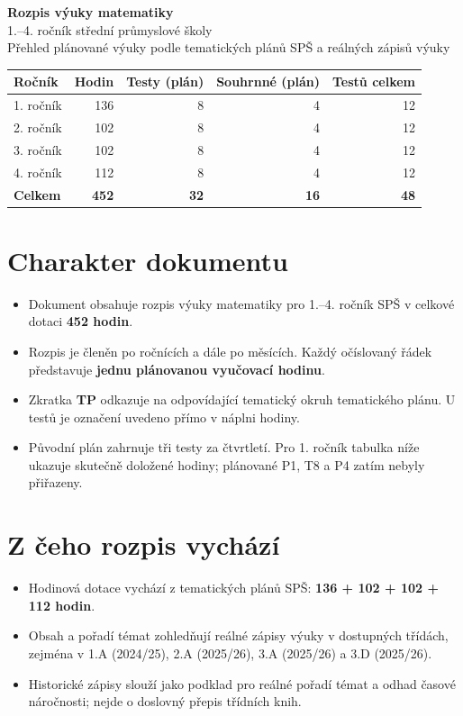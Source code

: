 \documentclass[10pt,a4paper]{article}
\begin{document}
\begin{center}
{\LARGE\bfseries Rozpis výuky matematiky}\\[3mm]
{\large 1.--4. ročník střední průmyslové školy}\\[3mm]
{\small Přehled plánované výuky podle tematických plánů SP\v{S} a reálných zápisů výuky}
\end{center}
\vspace{3mm}
\begin{tabularx}{\textwidth}{@{}Xrrrr@{}}\toprule
\textbf{Ročník} & \textbf{Hodin} & \textbf{Testy (plán)} & \textbf{Souhrnné (plán)} & \textbf{Testů celkem}\\\midrule
1. ročník & 136 & 8 & 4 & 12\\
2. ročník & 102 & 8 & 4 & 12\\
3. ročník & 102 & 8 & 4 & 12\\
4. ročník & 112 & 8 & 4 & 12\\\midrule
\textbf{Celkem} & \textbf{452} & \textbf{32} & \textbf{16} & \textbf{48}\\\bottomrule
\end{tabularx}
\vspace{4mm}
\section*{Charakter dokumentu}
\begin{itemize}\setlength{\itemsep}{2pt}
\item Dokument obsahuje rozpis výuky matematiky pro 1.--4. ročník SP\v{S} v celkové dotaci \textbf{452 hodin}.
\item Rozpis je členěn po ročnících a dále po měsících. Každý očíslovaný řádek představuje \textbf{jednu plánovanou vyučovací hodinu}.
\item Zkratka \textbf{TP} odkazuje na odpovídající tematický okruh tematického plánu. U testů je označení uvedeno přímo v náplni hodiny.
\item Původní plán zahrnuje tři testy za čtvrtletí. Pro 1. ročník tabulka níže ukazuje skutečně doložené hodiny; plánované P1, T8 a P4 zatím nebyly přiřazeny.
\end{itemize}

\section*{Z čeho rozpis vychází}
\begin{itemize}\setlength{\itemsep}{2pt}
\item Hodinová dotace vychází z tematických plánů SP\v{S}: \textbf{136 + 102 + 102 + 112 hodin}.
\item Obsah a pořadí témat zohledňují reálné zápisy výuky v dostupných třídách, zejména v 1.A (2024/25), 2.A (2025/26), 3.A (2025/26) a 3.D (2025/26).
\item Historické zápisy slouží jako podklad pro reálné pořadí témat a odhad časové náročnosti; nejde o doslovný přepis třídních knih.
\end{itemize}
\end{document}
